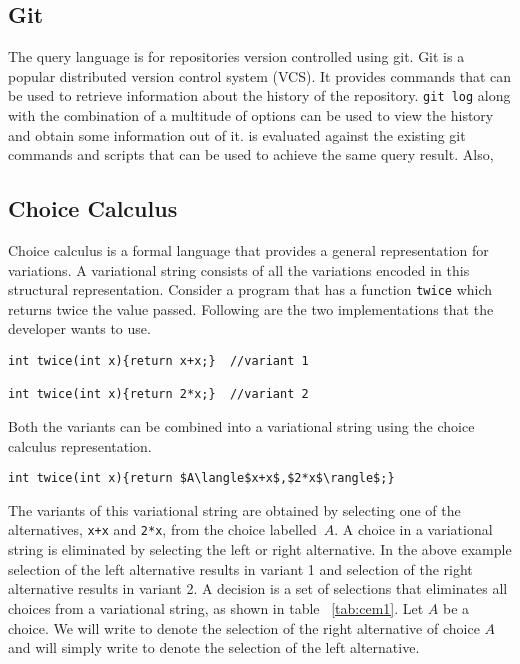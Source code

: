 \subsection{Git} \label{ssec:git}
The query language is for repositories version controlled using git. Git is a popular {} distributed version control system (VCS). It provides commands that can be used to retrieve information about the history of the repository. {\tt git log} along with the combination of a multitude of options can be used to view the history and obtain some information out of it. \gql is evaluated against the existing git commands and scripts that can be used to achieve the same query result. Also, 
\subsection{Choice Calculus}\label{ssec:vp}

Choice calculus is a formal language that provides a general representation for variations.
A variational string consists of all the variations encoded in this structural representation.
Consider a program that has a function {\tt twice} which returns twice the value passed. Following are the two implementations that the developer wants to use.
\begin{lstlisting}
int twice(int x){return x+x;}  //variant 1

int twice(int x){return 2*x;}  //variant 2
\end{lstlisting}
Both the variants can be combined into a variational string using the choice calculus representation.
\begin{lstlisting}
int twice(int x){return $A\langle$x+x$,$2*x$\rangle$;}
\end{lstlisting}
The variants of this variational string are obtained by selecting one of the alternatives, \lstinline|x+x| and \lstinline|2*x|, from the choice labelled~$A$.
A choice in a variational string is eliminated by selecting the left or right alternative. In the above example selection of the left alternative results in variant 1 and selection of the right alternative results in variant 2.
A decision is a set of selections that eliminates all choices from a variational string, as shown in table ~\ref{tab:cem1}.
Let $A$ be a choice.
We will write  to denote the selection of the right alternative of choice $A$ and will simply write  to denote the selection of the left alternative.


